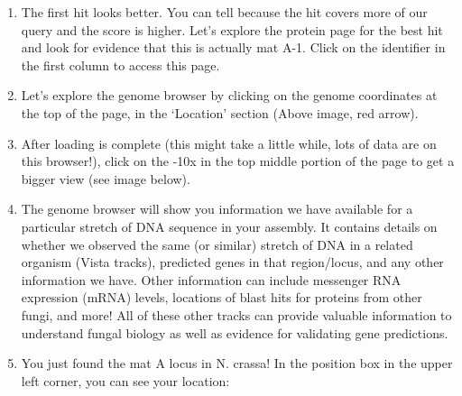 \documentclass[
  letterpaper,
  DIV=11,
  numbers=noendperiod]{scrreprt}
\providecommand{\tightlist}{%
  \setlength{\itemsep}{0pt}\setlength{\parskip}{0pt}}
\begin{document}
\begin{enumerate}
  \begin{itemize}
  \tightlist
  \item
    The first column shows the portal ID and transcript ID (since we are
    searching against nucleotides) of the hit. Portal IDs are unique
    identifiers assigned to each genome. For example, Neucr2 is the
    portal ID for Neurospora crassa OR74A, and it can be used to access
    the portal (e.g.~https://mycocosm.jgi.doe.gov/Neucr2). This unique
    identifier is also displayed across various portal pages to label
    data from a particular organism.
  \item
    The second column shows an alignment of that sequence against your
    query, which is helpful for seeing how well hits cover your query
    sequence.
  \item
    The score and EValue columns are also useful when assessing hit
    quality. Higher scores are better, and conversely, lower e-values
    are better.
  \end{itemize}
\item
  The first hit looks better. You can tell because the hit covers more
  of our query and the score is higher. Let's explore the protein page
  for the best hit and look for evidence that this is actually mat A-1.
  Click on the identifier in the first column to access this page.
\item
  Let's explore the genome browser by clicking on the genome coordinates
  at the top of the page, in the `Location' section (Above image, red
  arrow).
\item
  After loading is complete (this might take a little while, lots of
  data are on this browser!), click on the -10x in the top middle
  portion of the page to get a bigger view (see image below).
\item
  The genome browser will show you information we have available for a
  particular stretch of DNA sequence in your assembly. It contains
  details on whether we observed the same (or similar) stretch of DNA in
  a related organism (Vista tracks), predicted genes in that
  region/locus, and any other information we have. Other information can
  include messenger RNA expression (mRNA) levels, locations of blast
  hits for proteins from other fungi, and more! All of these other
  tracks can provide valuable information to understand fungal biology
  as well as evidence for validating gene predictions.
\item
  You just found the mat A locus in N. crassa! In the position box in
  the upper left corner, you can see your location:

\end{enumerate}
\end{document}
